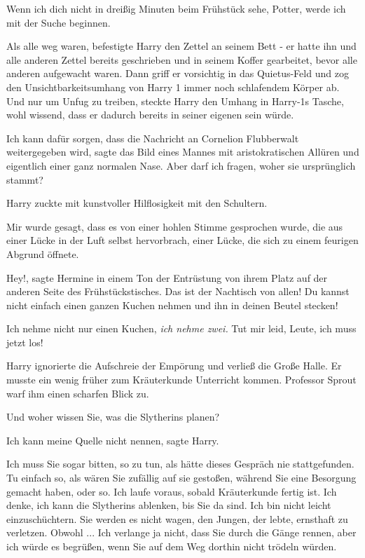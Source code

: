 \glqq{}Wenn ich dich nicht in dreißig Minuten beim Frühstück sehe, Potter, werde
ich mit der Suche beginnen.\grqq{}

Als alle weg waren, befestigte Harry den Zettel an seinem Bett - er hatte ihn
und alle anderen Zettel bereits geschrieben und in seinem Koffer gearbeitet,
bevor alle anderen aufgewacht waren. Dann griff er vorsichtig in das
Quietus-Feld und zog den Unsichtbarkeitsumhang von Harry 1 immer noch
schlafendem Körper ab. Und nur um Unfug zu treiben, steckte Harry den Umhang in
Harry-1s Tasche, wohl wissend, dass er dadurch bereits in seiner eigenen sein
würde.

\glqq{}Ich kann dafür sorgen, dass die Nachricht an Cornelion Flubberwalt
weitergegeben wird\grqq{}, sagte das Bild eines Mannes mit aristokratischen
Allüren und eigentlich einer ganz normalen Nase. \glqq{}Aber darf ich fragen,
woher sie ursprünglich stammt?\grqq{}

Harry zuckte mit kunstvoller Hilflosigkeit mit den Schultern.

\glqq{}Mir wurde gesagt, dass es von einer hohlen Stimme gesprochen wurde, die
aus einer Lücke in der Luft selbst hervorbrach, einer Lücke, die sich zu einem
feurigen Abgrund öffnete.\grqq{}

\glqq{}Hey!\grqq{}, sagte Hermine in einem Ton der Entrüstung von ihrem Platz auf
der anderen Seite des Frühstückstisches. \glqq{}Das ist der Nachtisch von allen!
Du kannst nicht einfach einen ganzen Kuchen nehmen und ihn in deinen Beutel
stecken!\grqq{}

\glqq{}Ich nehme nicht nur einen Kuchen, \emph{ich nehme zwei.} Tut mir leid,
Leute, ich muss jetzt los!\grqq{}

Harry ignorierte die Aufschreie der Empörung und verließ die Große Halle. Er
musste ein wenig früher zum Kräuterkunde Unterricht kommen. Professor Sprout
warf ihm einen scharfen Blick zu.

\glqq{}Und woher wissen Sie, was die Slytherins planen?\grqq{}

\glqq{}Ich kann meine Quelle nicht nennen\grqq{}, sagte Harry.

\glqq{}Ich muss Sie sogar bitten, so zu tun, als hätte dieses Gespräch nie
stattgefunden. Tu einfach so, als wären Sie zufällig auf sie gestoßen, während
Sie eine Besorgung gemacht haben, oder so. Ich laufe voraus, sobald Kräuterkunde
fertig ist. Ich denke, ich kann die Slytherins ablenken, bis Sie da sind. Ich
bin nicht leicht einzuschüchtern. Sie werden es nicht wagen, den Jungen, der
lebte, ernsthaft zu verletzen. Obwohl ... Ich verlange ja nicht, dass Sie durch
die Gänge rennen, aber ich würde es begrüßen, wenn Sie auf dem Weg dorthin nicht
trödeln würden.\grqq{}

